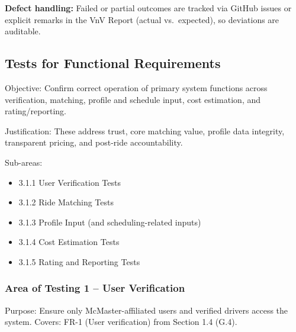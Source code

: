 \documentclass[12pt, titlepage]{article}
\begin{document}
\textbf{Defect handling:} Failed or partial outcomes are tracked via GitHub issues or explicit remarks in the VnV Report (actual vs.\ expected), so deviations are auditable.

\subsection{Tests for Functional Requirements}

Objective: Confirm correct operation of primary system functions across verification, matching, profile and schedule input, cost estimation, and rating/reporting.

Justification: These address trust, core matching value, profile data integrity, transparent pricing, and post-ride accountability.

Sub-areas:
\begin{itemize}
    \item 3.1.1 User Verification Tests
    \item 3.1.2 Ride Matching Tests
    \item 3.1.3 Profile Input (and scheduling-related inputs)
    \item 3.1.4 Cost Estimation Tests
    \item 3.1.5 Rating and Reporting Tests
\end{itemize}

\subsubsection{Area of Testing 1 – User Verification}

Purpose: Ensure only McMaster-affiliated users and verified drivers access the system.  
Covers: FR-1 (User verification) from Section 1.4 (G.4).
\end{document}
